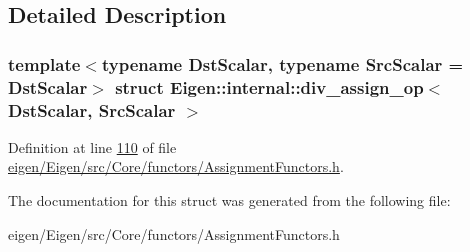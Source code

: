 \subsection{Detailed Description}
\subsubsection*{template$<$typename Dst\+Scalar, typename Src\+Scalar = Dst\+Scalar$>$\newline
struct Eigen\+::internal\+::div\+\_\+assign\+\_\+op$<$ Dst\+Scalar, Src\+Scalar $>$}



Definition at line \hyperlink{eigen_2_eigen_2src_2_core_2functors_2_assignment_functors_8h_source_l00110}{110} of file \hyperlink{eigen_2_eigen_2src_2_core_2functors_2_assignment_functors_8h_source}{eigen/\+Eigen/src/\+Core/functors/\+Assignment\+Functors.\+h}.



The documentation for this struct was generated from the following file\+:\begin{DoxyCompactItemize}
\item 
eigen/\+Eigen/src/\+Core/functors/\+Assignment\+Functors.\+h\end{DoxyCompactItemize}
